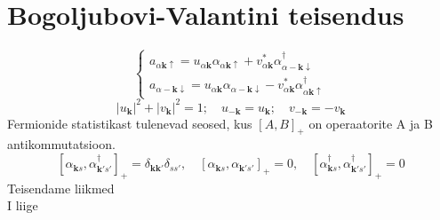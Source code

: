 \documentclass[class=article, crop=false]{standalone}
\begin{document}
\section{Bogoljubovi-Valantini teisendus}
\begin{equation}\label{BogoljubovValatin}
	\begin{cases}
		a_{ \alpha \mathbf{k} \uparrow} = u_{ \alpha \mathbf{k}} \alpha_{ \alpha \mathbf{k} \uparrow} + v_{ \alpha \mathbf{k}}^{ \ast} \alpha_{ \alpha - \mathbf{k} \downarrow}^{ \dagger} \\
		a_{ \alpha - \mathbf{k} \downarrow} = u_{ \alpha \mathbf{k}} \alpha_{ \alpha - \mathbf{k} \downarrow} - v_{ \alpha \mathbf{k}}^{ \ast} \alpha_{ \alpha \mathbf{k} \uparrow}^{ \dagger}
	\end{cases}
\end{equation}
\begin{equation}\label{BogoljubovValatinTingimused}
	\left| u_{ \mathbf{k}} \right|^{2} + \left| v_{ \mathbf{k}} \right|^{2} = 1; \quad u_{ - \mathbf{k}} = u_{ \mathbf{k}}; \quad v_{ - \mathbf{k}} = - v_{ \mathbf{k}}
\end{equation}
Fermionide statistikast tulenevad seosed, kus $ [A,B]_{+} $ on operaatorite A ja B antikommutatsioon.
\begin{equation}\label{key}
	\left[ \alpha_{ \mathbf{k} s}, \alpha_{ \mathbf{k}' s'}^{ \dagger} \right]_{+} = \delta_{ \mathbf{k} \mathbf{k}'} \delta_{ s s'}, \quad \left[ \alpha_{ \mathbf{k} s}, \alpha_{ \mathbf{k}' s'} \right]_{+} = 0, \quad \left[ \alpha_{ \mathbf{k} s}^{ \dagger}, \alpha_{ \mathbf{k}' s'}^{ \dagger} \right]_{+} = 0
\end{equation}
Teisendame liikmed\\
I liige
\end{document}
